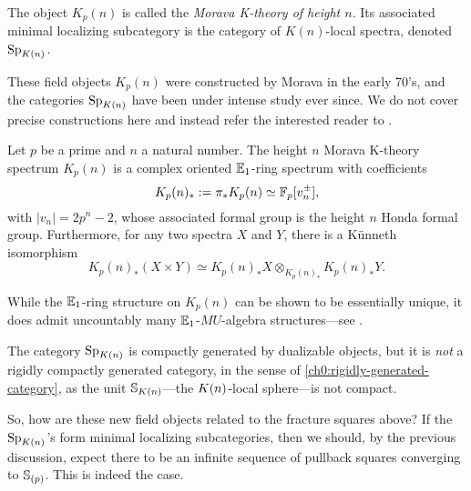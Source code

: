 \begin{notation}
    The object $K_p(n)$ is called the \emph{Morava K-theory of height $n$}. Its associated minimal localizing subcategory is the category of $K(n)$-local spectra, denoted $\SpK$.  
\end{notation}

These field objects $K_p(n)$ were constructed by Morava in the early 70's, and the categories $\SpK$ have been under intense study ever since. We do not cover precise constructions here and instead refer the interested reader to \cite{hovey-strickland_99}. 

\begin{proposition}
    \label{ch0:prop:properties-of-K(n)}
    Let $p$ be a prime and $n$ a natural number. The height $n$ Morava K-theory spectrum $K_p(n)$ is a complex oriented $\E_1$-ring spectrum with coefficients 
    $$K_p(n)_*:=\pi_* K_p(n) \simeq \F_p[v_n^{\pm}],$$ 
    with $|v_n|=2p^n-2$, whose associated formal group is the height $n$ Honda formal group. Furthermore, for any two spectra $X$ and $Y$, there is a Künneth isomorphism 
    $$K_p(n)_*(X\times Y)\simeq K_p(n)_*X\otimes_{K_p(n)_*} K_p(n)_*Y.$$
\end{proposition}

\begin{remark}
    While the $\E_1$-ring structure on $K_p(n)$ can be shown to be essentially unique, it does admit uncountably many $\E_1$-$MU$-algebra structures---see \cite{angeltveit_2011}. 
\end{remark}

\begin{remark}
    \label{ch0:rm:SpKn-not-rigidly-generated}
    The category $\SpK$ is compactly generated by dualizable objects, but it is \emph{not} a rigidly compactly generated category, in the sense of \cref{ch0:rigidly-generated-category}, as the unit $\S_\Kn$---the $\Kn$-local sphere---is not compact.  
\end{remark}

So, how are these new field objects related to the fracture squares above? If the $\SpK$'s form minimal localizing subcategories, then we should, by the previous discussion, expect there to be an infinite sequence of pullback squares converging to $\S_{(p)}$. This is indeed the case. 

